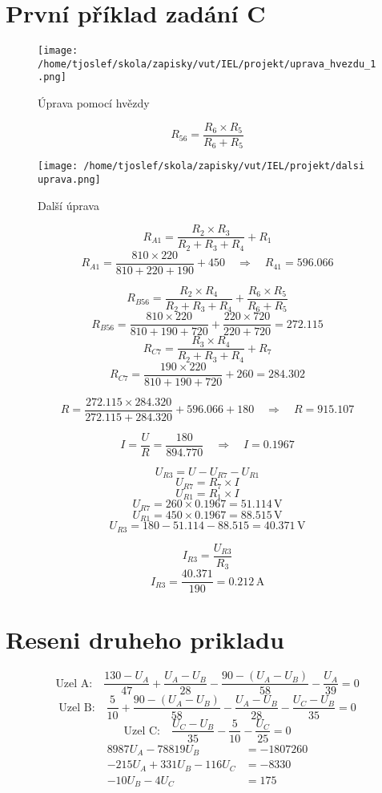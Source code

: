 \documentclass{article}
\begin{document}
\sloppy

\section{První příklad zadání C}

\begin{figure}[!ht]
  \centering
  \texttt{[image: /home/tjoslef/skola/zapisky/vut/IEL/projekt/uprava\_hvezdu\_1.png]}
  \caption{Úprava pomocí hvězdy}
  \label{fig:hvezda}
\end{figure}

\[
    R_{56} = \frac{R_6 \times R_5}{R_6 + R_5}
\]

\begin{figure}[!ht]
  \centering
  \texttt{[image: /home/tjoslef/skola/zapisky/vut/IEL/projekt/dalsi uprava.png]}
  \caption{Další úprava}
  \label{fig:dalsi_uprava}
\end{figure}

\[
R_{A1} = \frac{R_2 \times R_3}{R_2 + R_3 + R_4} + R_1
\]
\[
    R_{A1} = \frac{810 \times 220}{810 + 220 + 190} + 450 \quad \Rightarrow \quad R_{41} = 596.066
\]

\[
R_{B56} = \frac{R_2 \times R_4}{R_2 + R_3 + R_4} + \frac{R_6 \times R_5}{R_6 + R_5}
\]
\[
R_{B56} = \frac{810 \times 220}{810 + 190 + 720} + \frac{220 \times 720}{220 + 720}
= 272.115
\]
\[
R_{C7} = \frac{R_3 \times R_4}{R_2 + R_3 + R_4} + R_7
\]
\[
R_{C7} = \frac{190 \times 220}{810 + 190 + 720} + 260 = 284.302
\]

\[
R  = \frac{272.115 \times 284.320}{272.115 + 284.320} + 596.066 + 180 \quad \Rightarrow \quad R = 915.107
\]

\[
I = \frac{U}{R} = \frac{180}{894.770} \quad \Rightarrow \quad I = 0.1967
\]

\[
    U_{R3} = U - U_{R7} - U_{R1}
\]
\[
U_{R7} = R_7 \times I
\]
\[
    U_{R1} = R_1 \times I
\]
\[
U_{R7} = 260 \times 0.1967 = 51.114 \, \text{V}
\]
\[
    U_{R1} = 450 \times 0.1967 = 88.515 \, \text{V}
\]
\[
U_{R3}  = 180 - 51.114 - 88.515 = 40.371 \, \text{V}
\]

\[
I_{R3} = \frac{U_{R3}}{R_3}
\]
\[
I_{R3} = \frac{40.371}{190} = 0.212 \, \text{A}
\]

\clearpage
\section{Reseni druheho prikladu}

\[
    \text{Uzel A:} \quad \frac{130 - U_A}{47} + \frac{U_A - U_B}{28} - \frac{90 - (U_A - U_B)}{58} - \frac{U_A}{39} = 0
\]
\[
    \text{Uzel B:} \quad \frac{5}{10} + \frac{90 - (U_A - U_B)}{58} - \frac{U_A - U_B}{28} - \frac{U_C - U_B}{35} = 0
\]
\[
    \text{Uzel C:} \quad \frac{U_C - U_B}{35} - \frac{5}{10} - \frac{U_C}{25} = 0
\]
\begin{align}
    8987U_A - 78819U_B &= -1807260 \\
    -215U_A + 331U_B - 116U_C &= -8330 \\
    -10U_B - 4U_C &= 175
\end{align}
\end{document}
